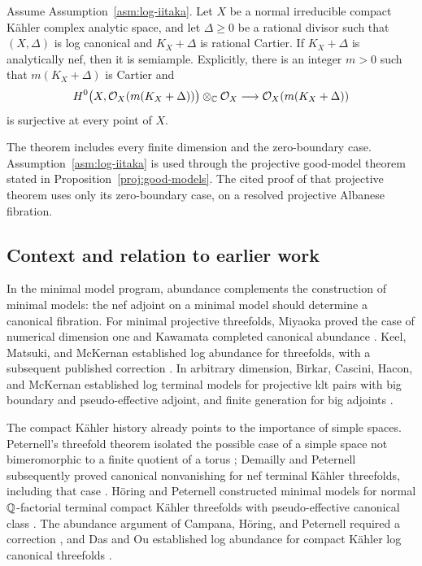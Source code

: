 \begin{theorem}\label{thm:main}
Assume Assumption~\ref{asm:log-iitaka}. Let \(X\) be a normal irreducible
compact Kähler complex analytic space, and let \(\Delta\geq0\) be a rational
divisor such that \((X,\Delta)\) is log canonical and \(K_X+\Delta\) is
rational Cartier. If \(K_X+\Delta\) is analytically nef, then it is
semiample. Explicitly, there is an integer \(m>0\) such that
\(m(K_X+\Delta)\) is Cartier and
\[
 H^0\bigl(X,\mathcal O_X(m(K_X+\Delta))\bigr)\otimes_{\mathbb C}\mathcal O_X
 \longrightarrow \mathcal O_X(m(K_X+\Delta))
\]
is surjective at every point of \(X\).
\end{theorem}

The theorem includes every finite dimension and the zero-boundary case.
Assumption~\ref{asm:log-iitaka} is used through the projective good-model
theorem stated in Proposition~\ref{proj:good-models}. The cited proof of
that projective theorem uses only its zero-boundary case, on a resolved
projective Albanese fibration.

\subsection{Context and relation to earlier work}

In the minimal model program, abundance complements the construction of
minimal models: the nef adjoint on a minimal model should determine a
canonical fibration. For minimal projective threefolds, Miyaoka proved the
case of numerical dimension one and Kawamata completed canonical abundance
\cite{Miyaoka1988,Kawamata1992}. Keel, Matsuki, and McKernan established
log abundance for threefolds, with a subsequent published correction
\cite{KMM1994,KMM2004}. In arbitrary dimension, Birkar, Cascini, Hacon, and
McKernan established log terminal models for projective klt pairs with big
boundary and pseudo-effective adjoint, and finite generation for big
adjoints \cite{BCHM2010}.

The compact Kähler history already points to the importance of simple
spaces. Peternell's threefold theorem isolated the possible case of a simple
space not bimeromorphic to a finite quotient of a torus
\cite{Peternell2001}; Demailly and Peternell subsequently proved canonical
nonvanishing for nef terminal Kähler threefolds, including that case
\cite{DemaillyPeternell2003}. Höring and Peternell constructed minimal models
for normal \(\mathbb Q\)-factorial terminal compact Kähler threefolds with pseudo-effective canonical class
\cite{HoeringPeternell2016}. The abundance argument of Campana, Höring, and
Peternell required a correction \cite{CHP2016,CHP2023}, and Das and Ou
established log abundance for compact Kähler log canonical threefolds
\cite[Corollary~1.3]{DasOu2026}.

